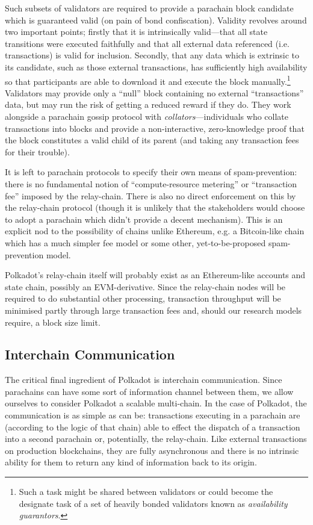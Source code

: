 \documentclass[usepdftitle=false]{beamer}
\makeatletter
\newcommand*\eg{e.g.\@\xspace}
\makeatother
\begin{document}
\begin{frame}
 Such subsets of validators are required to provide a parachain block candidate which is guaranteed valid (on pain of bond confiscation). Validity revolves around two important points; firstly that it is intrinsically valid---that all state transitions were executed faithfully and that all external data referenced (i.e. transactions) is valid for inclusion. Secondly, that any data which is extrinsic to its candidate, such as those external transactions, has sufficiently high availability so that participants are able to download it and execute the block manually.\footnote{Such a task might be shared between validators or could become the designate task of a set of heavily bonded validators known as \textit{availability guarantors}.} Validators may provide only a ``null'' block containing no external ``transactions'' data, but may run the risk of getting a reduced reward if they do. They work alongside a parachain gossip protocol with \emph{collators}---individuals who collate transactions into blocks and provide a non-interactive, zero-knowledge proof that the block constitutes a valid child of its parent (and taking any transaction fees for their trouble).

 It is left to parachain protocols to specify their own means of spam-prevention: there is no fundamental notion of ``compute-resource metering'' or ``transaction fee'' imposed by the relay-chain. There is also no direct enforcement on this by the relay-chain protocol (though it is unlikely that the stakeholders would choose to adopt a parachain which didn't provide a decent mechanism). This is an explicit nod to the possibility of chains unlike Ethereum, \eg a Bitcoin-like chain which has a much simpler fee model or some other, yet-to-be-proposed spam-prevention model.

 Polkadot's relay-chain itself will probably exist as an Ethereum-like accounts and state chain, possibly an EVM-derivative. Since the relay-chain nodes will be required to do substantial other processing, transaction throughput will be minimised partly through large transaction fees and, should our research models require, a block size limit.

\subsection{Interchain Communication}
\label{interchain-communication}

 The critical final ingredient of Polkadot is interchain communication. Since parachains can have some sort of information channel between them, we allow ourselves to consider Polkadot a scalable multi-chain. In the case of Polkadot, the communication is as simple as can be: transactions executing in a parachain are (according to the logic of that chain) able to effect the dispatch of a transaction into a second parachain or, potentially, the relay-chain. Like external transactions on production blockchains, they are fully asynchronous and there is no intrinsic ability for them to return any kind of information back to its origin.


\end{frame}
\end{document}
